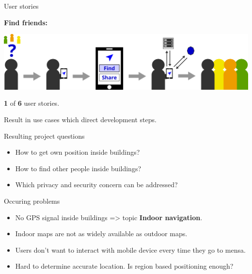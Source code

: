 \documentclass[9pt]{beamer}
\begin{document}
\begin{frame}{User stories}

	\textbf{Find friends:}
	
	\vspace{0.2cm}

	\begin{center}
	
		\includegraphics[width=\textwidth]{user-story}
	
	\end{center}
	
	\vspace{1cm}
	
	\textbf{1} of \textbf{6} user stories.
	
	Result in use cases which direct development steps.

\end{frame}

\begin{frame}{Resulting project questions}

	\begin{itemize}
	
		\item How to get own position inside buildings?
		\item How to find other people inside buildings?
		\item Which privacy and security concern can be addressed?
	
	\end{itemize}

\end{frame}

\begin{frame}{Occuring problems}

	\begin{itemize}
	
		\item No GPS signal inside buildings => topic \textbf{Indoor navigation}.
		\item Indoor maps are not as widely available as outdoor maps.		
		\item Users don't want to interact with mobile device every time they go to mensa. 		
		\item Hard to determine accurate location. Is region based positioning enough?
	
	\end{itemize}

\end{frame}
\end{document}
